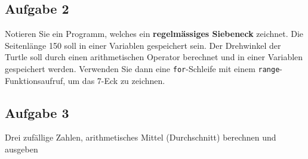 
\newpage

\subsection{Aufgabe 2}

Notieren Sie ein Programm, welches ein \textbf{regelmässiges Siebeneck} zeichnet. Die Seitenlänge \num{150} soll in einer Variablen gespeichert sein. Der Drehwinkel der Turtle soll durch einen arithmetischen Operator berechnet und in einer Variablen gespeichert werden. Verwenden Sie dann eine \lstinline{for}-Schleife mit einem \lstinline{range}-Funktionsaufruf, um das \num{7}-Eck zu zeichnen.

\fillwithgrid{2in}

\subsection{Aufgabe 3}

Drei zufällige Zahlen, arithmetisches Mittel (Durchschnitt) berechnen und ausgeben

